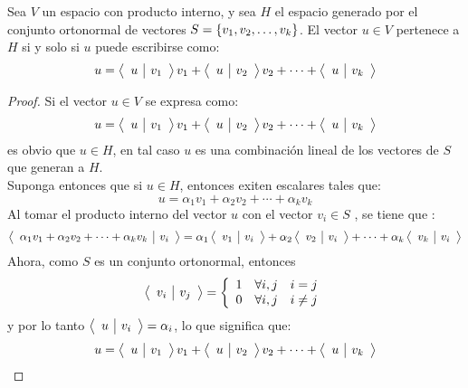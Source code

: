 \begin{theorem}
Sea $V$ un espacio con producto interno, y sea $H$ el espacio generado por el conjunto ortonormal de vectores $S = \conjvect{v}{k}$. El vector $u \in V$ pertenece a $H$ si y solo si $u$ puede escribirse como:
$$u = \prodInt{u}{v_1}v_1 + \prodInt{u}{v_2}v_2 + \cdots + \prodInt{u}{v_k}$$
\end{theorem}
\begin{proof}
Si el vector $u \in V$ se expresa como: 
$$u = \prodInt{u}{v_1}v_1 + \prodInt{u}{v_2}v_2 + \cdots + \prodInt{u}{v_k}$$
es obvio que $u \in H$, en tal caso $u$ es una combinación lineal de los vectores de $S$ que generan a $H$.\\
Suponga entonces que si $u \in H$, entonces exiten escalares tales que:
$$u = \alpha_1v_1 + \alpha_2v_2 + \cdots + \alpha_k v_k$$
Al tomar el producto interno del vector $u$ con el vector $v_i \in S$ ,  se tiene que :
$$\prodInt{\alpha_1v_1 + \alpha_2v_2 + \cdots + \alpha_k v_k}{v_i} = \alpha_1\prodInt{v_1}{v_i} + \alpha_2\prodInt{v_2}{v_i} + \cdots + \alpha_k \prodInt{v_k}{v_i}$$
Ahora, como $S$ es un conjunto ortonormal, entonces 
$$\prodInt{v_i}{v_j} = \left\{\begin{array}{cll}
    1 & \forall i,j & i = j\\
    0 & \forall i,j & i \neq j 
\end{array}\right.$$
y por lo tanto $\prodInt{u}{v_i} = \alpha_i$, lo que significa que:
$$u = \prodInt{u}{v_1}v_1 + \prodInt{u}{v_2}v_2 + \cdots + \prodInt{u}{v_k}$$
\end{proof}

